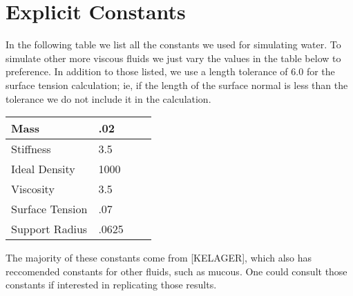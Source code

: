 \documentclass[11pt]{article}
\begin{document}
\section*{Explicit Constants}
In the following table we list all the constants we used for simulating water. To simulate other more viscous fluids we just vary the values in the table below to preference. In addition to those listed, we use a length tolerance of $6.0$ for the surface tension calculation; ie, if the length of the surface normal is less than the tolerance we do not include it in the calculation.

\begin{center}
    \begin{tabular}{| l | l | l | l |}
    \hline
    Mass & .02 \\ \hline
    Stiffness & 3.5\\ \hline
    Ideal Density & 1000 \\ \hline
    Viscosity & 3.5\\ \hline
    Surface Tension & .07 \\ \hline
    Support Radius & .0625 \\ \hline
    \end{tabular}
\end{center}
The majority of these constants come from [KELAGER], which also has reccomended constants for other fluids, such as mucous. One could consult those constants if interested in replicating those results.
\end{document}

